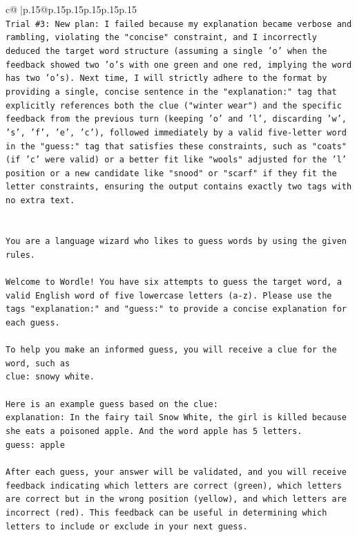 \documentclass{article}
\begin{document}
{\begin{supertabular}{c@{$\;$}|p{.15\linewidth}@{}p{.15\linewidth}p{.15\linewidth}p{.15\linewidth}p{.15\linewidth}p{.15\linewidth}}
{{{\\ 
\texttt{Trial \#3: New plan: I failed because my explanation became verbose and rambling, violating the "concise" constraint, and I incorrectly deduced the target word structure (assuming a single 'o' when the feedback showed two 'o's with one green and one red, implying the word has two 'o's). Next time, I will strictly adhere to the format by providing a single, concise sentence in the "explanation:" tag that explicitly references both the clue ("winter wear") and the specific feedback from the previous turn (keeping 'o' and 'l', discarding 'w', 's', 'f', 'e', 'c'), followed immediately by a valid five{-}letter word in the "guess:" tag that satisfies these constraints, such as "coats" (if 'c' were valid) or a better fit like "wools" adjusted for the 'l' position or a new candidate like "snood" or "scarf" if they fit the letter constraints, ensuring the output contains exactly two tags with no extra text.} \\
\\ 
\\ 
\texttt{You are a language wizard who likes to guess words by using the given rules.} \\
\\ 
\texttt{Welcome to Wordle! You have six attempts to guess the target word, a valid English word of five lowercase letters (a{-}z). Please use the tags "explanation:" and "guess:" to provide a concise explanation for each guess.} \\
\\ 
\texttt{To help you make an informed guess, you will receive a clue for the word, such as} \\
\texttt{clue: snowy white.} \\
\\ 
\texttt{Here is an example guess based on the clue:} \\
\texttt{explanation: In the fairy tail Snow White, the girl is killed because she eats a poisoned apple. And the word apple has 5 letters.} \\
\texttt{guess: apple} \\
\\ 
\texttt{After each guess, your answer will be validated, and you will receive feedback indicating which letters are correct (green), which letters are correct but in the wrong position (yellow), and which letters are incorrect (red). This feedback can be useful in determining which letters to include or exclude in your next guess.} \\
\\ 
}}}
\end{supertabular}}
\end{document}
